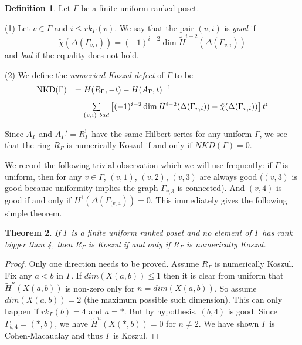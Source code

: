\documentclass[11pt,righttag]{amsart}
\newtheorem{thm}{Theorem}[section]
\theoremstyle{definition}
\newtheorem{defn}[thm]{Definition}
\begin{document}
\begin{defn} Let $\Gamma$ be a finite uniform ranked poset.

(1) Let $v\in \Gamma$ and $i\le rk_\Gamma(v)$.  We say that the pair $(v,i)$ is {\it good} if 
$$ \tilde\chi(\Delta(\Gamma_{v,i})) = (-1)^{i-2}\dim\tilde H^{i-2}(\Delta(\Gamma_{v,i}))$$
and {\it bad} if the equality does not hold. 

(2) We define the {\it numerical Koszul defect} of $\Gamma$ to be 
$$\begin{array}{ll}
 {{\rm NKD}}(\Gamma) &= H(R_\Gamma, -t) - H(A_\Gamma,t)^{-1}\\[8pt]
 & = \sum\limits_{(v,i)\  bad} \left[ (-1)^{i-2}\dim\tilde H^{i-2}(\Delta(\Gamma_{v,i}))
- \tilde\chi(\Delta(\Gamma_{v,i}))\right] t^i\\
\end{array} $$
\end{defn}

Since $A_\Gamma$ and $A_\Gamma' = R_\Gamma^!$ have the same Hilbert series for any uniform $\Gamma$, we see that the ring 
$R_\Gamma$ is numerically Koszul if and only if $NKD(\Gamma) = 0$. 

We record the following trivial observation which we will use frequently:  if $\Gamma$ is uniform, then for  any $v\in \Gamma$, $(v,1)$,
$(v,2)$, $(v,3)$ are always good ($(v,3)$ is good because uniformity implies the graph $\Gamma_{v,3}$ is connected).  And $(v,4)$ is good if and only if $H^1(\Delta(\Gamma_{(v,4})) = 0$.  This immediately gives the following simple theorem.

\begin{thm}\label{rank4}  If $\Gamma$ is a finite uniform ranked poset and no element of $\Gamma$ has rank bigger than 4, then $R_\Gamma$ is Koszul if and only if $R_\Gamma$ is numerically Koszul.
\end{thm}

\begin{proof}
Only one direction needs to be proved. Assume $R_\Gamma$ is numerically Koszul.  Fix any $a<b$ in $\Gamma$.  If $dim(X(a,b))\le 1$ 
then it is clear from uniform that $\tilde H^n(X(a,b))$ is non-zero only for $n=dim(X(a,b))$.  So assume $dim(X(a,b))=2$ 
(the maximum possible such dimension).  This can only happen if $rk_\Gamma(b) = 4$ and $a = *$.  But by hypothesis, $(b,4)$ is 
good. Since $\Gamma_{b,4} = (*,b)$, we have $\tilde H^n(X(*,b)) =0$ for $n\ne 2$.  We have shown $\Gamma$ is Cohen-Macaualay 
and thus $\Gamma$ is Koszul.
\end{proof}
\end{document}
